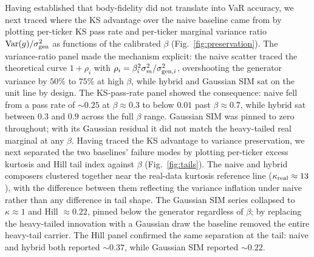 Having established that body-fidelity did not translate into VaR
accuracy, we next traced where the KS advantage over the naive
baseline came from by plotting per-ticker KS pass rate and
per-ticker marginal variance ratio $\mathrm{Var}(g) / \sigma_{\mathrm{gen}}^2$ as functions of the
calibrated $\beta$ (Fig.~\ref{fig:preservation}). The variance-ratio
panel made the mechanism explicit: the naive scatter traced the
theoretical curve $1 + \rho_i$ with
$\rho_i = \beta_i^2 \sigma_m^2 / \sigma_{\mathrm{gen},i}^2$, overshooting the
generator variance by $50\%$ to $75\%$ at high $\beta$, while hybrid
and Gaussian SIM sat on the unit line by design. The KS-pass-rate
panel showed the consequence: naive fell from a pass rate of
$\sim 0.25$ at $\beta \approx 0.3$ to below $0.01$ past
$\beta \approx 0.7$, while hybrid sat between $0.3$ and $0.9$ across
the full $\beta$ range. Gaussian SIM was pinned to zero throughout;
with its Gaussian residual it did not match the heavy-tailed real
marginal at any $\beta$. Having traced the KS advantage to variance
preservation, we next separated the two baselines' failure modes by
plotting per-ticker excess kurtosis and Hill tail index against
$\beta$ (Fig.~\ref{fig:tails}). The naive and hybrid composers
clustered together near the real-data kurtosis reference line
($\kappa_{\mathrm{real}} \approx 13$), with the difference between them
reflecting the variance inflation under naive rather than any
difference in tail shape. The Gaussian SIM series collapsed to
$\kappa \approx 1$ and Hill $\approx 0.22$, pinned below the generator
regardless of $\beta$; by replacing the heavy-tailed innovation with a
Gaussian draw the baseline removed the entire heavy-tail carrier. The
Hill panel confirmed the same separation at the tail: naive and
hybrid both reported $\sim 0.37$, while Gaussian SIM reported
$\sim 0.22$.

